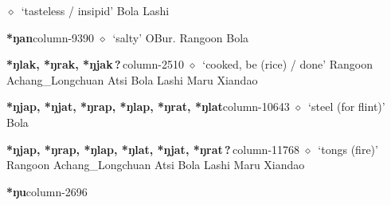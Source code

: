          $\diamond$~`tasteless / insipid'
         Bola 
\hspace{1ex}
         Lashi 
  \item {\footnotesize \textbf{*ŋan}}{\tiny column-9390}
         $\diamond$~`salty'
         OBur. 
\hspace{1ex}
         Rangoon 
\hspace{1ex}
         Bola 
  \item {\footnotesize \textbf{*ŋlak, *ŋrak, *ŋjak\,?\,}}{\tiny column-2510}
         $\diamond$~`cooked, be (rice) / done'
         Rangoon 
\hspace{1ex}
         Achang\_Longchuan 
\hspace{1ex}
         Atsi 
\hspace{1ex}
         Bola 
\hspace{1ex}
         Lashi 
\hspace{1ex}
         Maru 
\hspace{1ex}
         Xiandao 
  \item {\footnotesize \textbf{*ŋjap, *ŋjat, *ŋrap, *ŋlap, *ŋrat, *ŋlat}}{\tiny column-10643}
         $\diamond$~`steel (for flint)'
         Bola 
  \item {\footnotesize \textbf{*ŋjap, *ŋrap, *ŋlap, *ŋlat, *ŋjat, *ŋrat\,?\,}}{\tiny column-11768}
         $\diamond$~`tongs (fire)'
         Rangoon 
\hspace{1ex}
         Achang\_Longchuan 
\hspace{1ex}
         Atsi 
\hspace{1ex}
         Bola 
\hspace{1ex}
         Lashi 
\hspace{1ex}
         Maru 
\hspace{1ex}
         Xiandao 
  \item {\footnotesize \textbf{*ŋu}}{\tiny column-2696}
